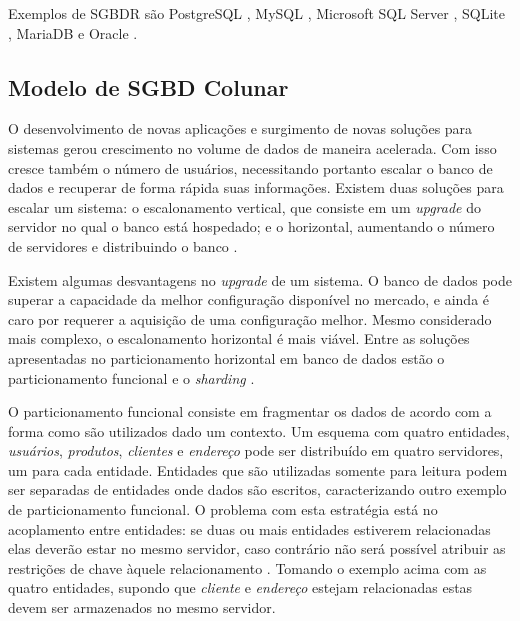 Exemplos de SGBDR são PostgreSQL \cite{postgres2018r}, MySQL \cite{mysql2018r}, Microsoft SQL Server \cite{microsoft2018r}, SQLite \cite{lite2018r}, MariaDB \cite{maria2018r} e Oracle \cite{oracle2018r}. 

\subsection{Modelo de SGBD Colunar}


O desenvolvimento de novas aplicações e surgimento de novas soluções 
para sistemas gerou crescimento no volume de dados de maneira acelerada. 
Com isso cresce também o número de usuários, necessitando portanto escalar 
o banco de dados e recuperar de forma rápida suas informações. Existem duas soluções para escalar um sistema: o 
escalonamento vertical, que consiste em um \textit{upgrade} do servidor no 
qual o banco está hospedado; e o horizontal, aumentando o número de 
servidores e distribuindo o banco \cite{pritchett2008base, sharding2018educative}. 

Existem algumas desvantagens no \textit{upgrade} de um sistema. 
O banco de dados pode superar a capacidade da melhor configuração 
disponível no mercado, e ainda é caro por requerer a aquisição de 
uma configuração melhor. Mesmo considerado mais complexo, o 
escalonamento horizontal é mais viável. Entre as soluções apresentadas 
no particionamento horizontal em banco de dados estão o particionamento funcional e o 
\textit{sharding} \cite{pritchett2008base}. 

O particionamento funcional consiste em fragmentar os dados de acordo 
com a forma como são utilizados dado um contexto. Um esquema com quatro entidades, 
\textit{usuários}, \textit{produtos}, \textit{clientes} e \textit{endereço} 
pode ser distribuído em quatro servidores, 
um para cada entidade. Entidades que são utilizadas somente para leitura podem 
ser separadas de entidades onde dados são escritos, caracterizando outro 
exemplo de particionamento funcional. O problema com esta estratégia está 
no acoplamento entre entidades: se duas ou mais entidades estiverem 
relacionadas elas deverão estar no mesmo servidor, caso contrário não 
será possível atribuir as restrições de chave àquele relacionamento \cite{pritchett2008base}. 
Tomando o exemplo acima com as quatro entidades, supondo que \textit{cliente} 
e \textit{endereço} estejam relacionadas estas devem 
ser armazenados no mesmo servidor. 

